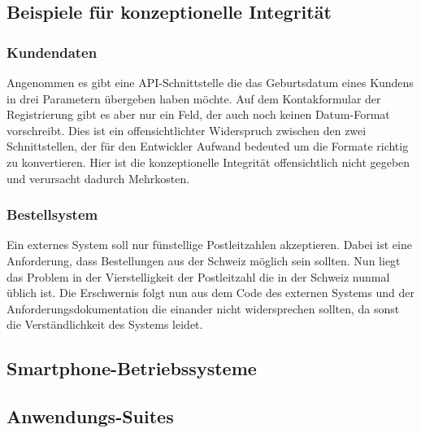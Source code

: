 \documentclass[a4paper, ngerman, 12pt, usenames, dvipsnames]{article}
\begin{document}
\subsection{Beispiele für konzeptionelle Integrität}

\subsubsection{Kundendaten}
Angenommen es gibt eine API-Schnittstelle die das Geburtsdatum eines Kundens in drei Parametern übergeben haben möchte. Auf dem Kontakformular der Registrierung gibt es aber nur ein Feld, der auch noch keinen Datum-Format vorschreibt. Dies ist ein offensichtlichter Widerspruch zwischen den zwei Schnittstellen, der für den Entwickler Aufwand bedeuted um die Formate richtig zu konvertieren. Hier ist die konzeptionelle Integrität offensichtlich nicht gegeben und verursacht dadurch Mehrkosten.

\subsubsection{Bestellsystem}
Ein externes System soll nur fünstellige Postleitzahlen akzeptieren. Dabei ist eine Anforderung, dass Bestellungen aus der Schweiz möglich sein sollten. Nun liegt das Problem in der Vierstelligkeit der Postleitzahl die in der Schweiz nunmal üblich ist. Die Erschwernis folgt nun aus dem Code des externen Systems und der Anforderungsdokumentation die einander nicht widersprechen sollten, da sonst die Verständlichkeit des Systems leidet.

\subsection{Smartphone-Betriebssysteme}

\subsection{Anwendungs-Suites}
\end{document}
